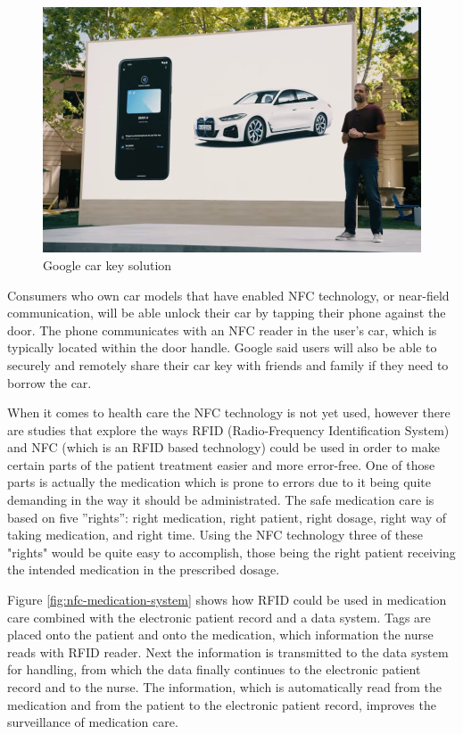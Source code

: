 \begin{figure}
\centering
\includegraphics[width=\textwidth]{figures/google_car_key.png}
\caption{Google car key solution \cite{carKey}}
\label{fig:google-car-key}
\end{figure}

Consumers who own car models that have enabled NFC technology, or near-field communication, will be able unlock their car by tapping their phone against the door. The phone communicates with an NFC reader in the user’s car, which is typically located within the door handle. Google said users will also be able to securely and remotely share their car key with friends and family if they need to borrow the car. \cite{carKey}

When it comes to health care the NFC technology is not yet used, however there are studies that explore the ways RFID (Radio-Frequency Identification System) and NFC (which is an RFID based technology) could be used in order to make certain parts of the patient treatment easier and more error-free. One of those parts is actually the medication which is prone to errors due to it being quite demanding in the way it should be administrated. The safe medication care is based on five ”rights”: right medication, right patient, right dosage, right way of taking medication, and right time. \cite{lahtela2008rfid} Using the NFC technology three of these "rights" would be quite easy to accomplish, those being the right patient receiving the intended medication in the prescribed dosage.

Figure \ref{fig:nfc-medication-system} shows how RFID could be used in medication care combined with the electronic patient record and a data system. Tags are placed onto the patient and onto the medication, which information the nurse reads with RFID reader. Next the information is transmitted to the data system for handling, from which the data finally continues to the electronic patient record and to the nurse. The information, which is automatically read from the medication and from the patient to the electronic patient record, improves the surveillance of medication care. \cite{lahtela2008rfid}

